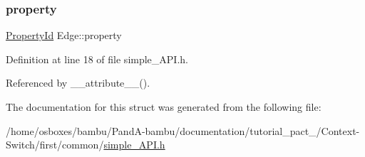 \mbox{\label{structEdge_a827b09ad3a1db278e7a0577ddd0dd4cf}} 
\subsubsection{\texorpdfstring{property}{property}}
{\footnotesize\ttfamily \hyperlink{first_2common_2simple__API_8h_a5c6efcf738a88b5e26ce2b06f4008588}{Property\+Id} Edge\+::property}



Definition at line 18 of file simple\+\_\+\+A\+P\+I.\+h.



Referenced by \+\_\+\+\_\+attribute\+\_\+\+\_\+().



The documentation for this struct was generated from the following file\+:\begin{DoxyCompactItemize}
\item 
/home/osboxes/bambu/\+Pand\+A-\/bambu/documentation/tutorial\+\_\+pact\+\_/\+Context-\/\+Switch/first/common/\hyperlink{first_2common_2simple__API_8h}{simple\+\_\+\+A\+P\+I.\+h}\end{DoxyCompactItemize}
